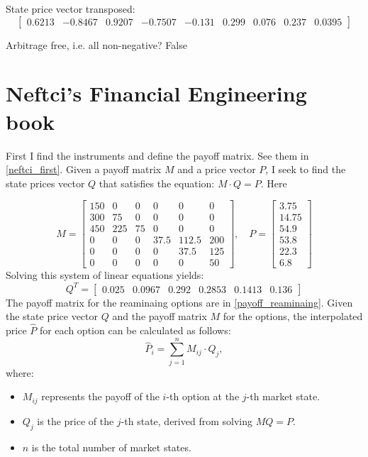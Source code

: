 \documentclass{article}
\begin{document}
State price vector transposed: \[
    \begin{bmatrix} 0.6213 & -0.8467 & 0.9207 & -0.7507 & -0.131 & 0.299 & 0.076 & 0.237 & 0.0395 \end{bmatrix}
\]

Arbitrage free, i.e. all non-negative? False

\section{Neftci’s Financial Engineering book}

First I find the instruments and define the payoff matrix.
See them in \autoref{neftci_first}.
Given a payoff matrix \( M \) and a price vector \( P \),
I seek to find the state prices vector \( Q \)
that satisfies the equation: \(M \cdot Q = P\). Here

\[
    M = \begin{bmatrix}
        150 & 0   & 0  & 0    & 0     & 0   \\
        300 & 75  & 0  & 0    & 0     & 0   \\
        450 & 225 & 75 & 0    & 0     & 0   \\
        0   & 0   & 0  & 37.5 & 112.5 & 200 \\
        0   & 0   & 0  & 0    & 37.5  & 125 \\
        0   & 0   & 0  & 0    & 0     & 50
    \end{bmatrix},
    \quad P = \begin{bmatrix}
        3.75  \\
        14.75 \\
        54.9  \\
        53.8  \\
        22.3  \\
        6.8
    \end{bmatrix}
\]
Solving this system of linear equations yields: \[
    Q^T = \begin{bmatrix}
        0.025 & 0.0967 & 0.292 & 0.2853 & 0.1413 & 0.136
    \end{bmatrix}
\]
The payoff matrix for the reaminaing options are in \autoref{payoff_reaminaing}.
Given the state price vector \( Q \) and the payoff matrix \( M \) for the options,
the interpolated price \( \hat{P} \) for each option can be calculated as follows:
\[
    \hat{P}_i = \sum_{j=1}^{n} M_{ij} \cdot Q_j,
\]
where:
\begin{itemize}
    \item \( M_{ij} \) represents the payoff of the \( i \)-th option at the \( j \)-th market state.
    \item \( Q_j \) is the price of the \( j \)-th state, derived from solving \( MQ = P \).
    \item \( n \) is the total number of market states.
\end{itemize}
\end{document}
